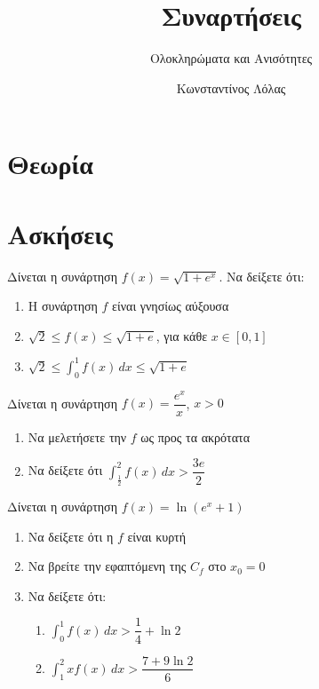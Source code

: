 \documentclass{presentation}
\title{Συναρτήσεις}
\subtitle{Ολοκληρώματα και Ανισότητες}
\author[Λόλας]{Κωνσταντίνος Λόλας}
\begin{document}
\begin{frame}
  \titlepage
\end{frame}

\section{Θεωρία}

\section{Ασκήσεις}

\exercises

\begin{askisi}
  Δίνεται η συνάρτηση $f(x)=\sqrt{1+e^x}$. Να δείξετε ότι:
  \begin{enumerate}[<+->]
    \item Η συνάρτηση $f$ είναι γνησίως αύξουσα
    \item $\sqrt{2}\le f(x)\le \sqrt{1+e}$, για κάθε $x\in [0,1]$
    \item $\sqrt{2}\le \int_{0}^{1} f(x)\, dx\le \sqrt{1+e}$
  \end{enumerate}
\end{askisi}

\begin{askisi}
  Δίνεται η συνάρτηση $f(x)=\dfrac{e^x}{x}$, $x>0$
  \begin{enumerate}[<+->]
    \item Να μελετήσετε την $f$ ως προς τα ακρότατα
    \item Να δείξετε ότι $\int_{\frac{1}{2}}^{2}f(x)\, dx>\dfrac{3e}{2}$
  \end{enumerate}
\end{askisi}

\begin{askisi}
  Δίνεται η συνάρτηση $f(x)=\ln (e^x+1)$
  \begin{enumerate}[<+->]
    \item Να δείξετε ότι η $f$ είναι κυρτή
    \item Να βρείτε την εφαπτόμενη της $C_f$ στο $x_0=0$
    \item Να δείξετε ότι:
          \begin{enumerate}[<+->]
            \item $\int_{0}^{1}f(x)\, dx>\dfrac{1}{4}+\ln 2$
            \item $\int_{1}^{2}xf(x)\, dx>\dfrac{7+9\ln 2}{6}$
          \end{enumerate}
  \end{enumerate}
\end{askisi}
\end{document}
